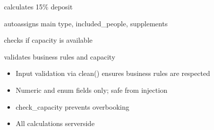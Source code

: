 \documentclass[letterpaper,10pt,english]{sphinxmanual}
\begin{document}
\begin{fulllineitems}
\begin{fulllineitems}
\end{fulllineitems}



\begin{fulllineitems}

\pysigstartsignatures
\pysigline
{}
\pysigstopsignatures
\sphinxAtStartPar
calculates 15\% deposit

\end{fulllineitems}



\begin{fulllineitems}

\pysigstartsignatures
\pysigline
{}
\pysigstopsignatures
\sphinxAtStartPar
auto\sphinxhyphen{}assigns main type, included\_people, supplements

\end{fulllineitems}



\begin{fulllineitems}

\pysigstartsignatures
\pysigline
{}
\pysigstopsignatures
\sphinxAtStartPar
checks if capacity is available

\end{fulllineitems}



\begin{fulllineitems}

\pysigstartsignatures
\pysigline
{}
\pysigstopsignatures
\sphinxAtStartPar
validates business rules and capacity

\end{fulllineitems}

\begin{description}
\begin{itemize}
\item {} 
\sphinxAtStartPar
Input validation via clean() ensures business rules are respected

\item {} 
\sphinxAtStartPar
Numeric and enum fields only; safe from injection

\item {} 
\sphinxAtStartPar
check\_capacity prevents overbooking

\item {} 
\sphinxAtStartPar
All calculations server\sphinxhyphen{}side


\end{itemize}
\end{description}
\end{fulllineitems}
\end{document}
